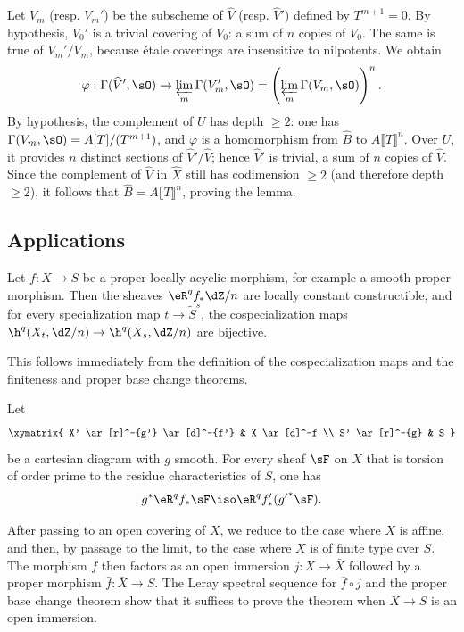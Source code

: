 \documentclass[oneside]{book}
\begin{document}
Let $V_m$ (resp. $V_m'$) be the subscheme of $\widehat V$ (resp.
$\widehat V'$) defined by $T^{m+1}=0$. By hypothesis, $V_0'$ is a
trivial covering of $V_0$: a sum of $n$ copies of $V_0$. The same is true
of $V_m'/V_m$, because étale coverings are insensitive to nilpotents.
We obtain
\[
  \varphi : \Gamma(\widehat V',\sO) \to \varprojlim_m \Gamma(V_m',\sO) = \left(\varprojlim_m \Gamma(V_m,\sO)\right)^n \text{.}
\]
By hypothesis, the complement of $U$ has depth $\geqslant2$: one has
$\Gamma(V_m,\sO)=A[T]/(T^{m+1})$, and $\varphi$ is a homomorphism from
$\widehat B$ to $A\llbracket T\rrbracket^n$. Over $U$, it provides $n$
distinct sections of $\widehat V'/\widehat V$; hence $\widehat V'$ is
trivial, a sum of $n$ copies of $\widehat V$. Since the complement of
$\widehat V$ in $\widehat X$ still has codimension $\geqslant2$ (and
therefore depth $\geqslant2$), it follows that
$\widehat B=A\llbracket T\rrbracket^n$, proving the lemma.

\subsection{Applications}\label{I:5-3}

\begin{theorem}\label{I:5-3-1}
Let $f:X\to S$ be a proper locally acyclic morphism, for example a smooth
proper morphism. Then the sheaves $\eR^qf_*\dZ/n$ are locally constant
constructible, and for every specialization map $t\to\widetilde S^s$,
the cospecialization maps
$\h^q(X_t,\dZ/n)\to\h^q(X_s,\dZ/n)$ are bijective.
\end{theorem}

This follows immediately from the definition of the cospecialization maps
and the finiteness and proper base change theorems.

\begin{theorem}\label{I:5-3-2}
Let
\[\xymatrix{
  X' \ar[r]^-{g'} \ar[d]^-{f'}
    & X \ar[d]^-f \\
  S' \ar[r]^-{g}
    & S
}\]
be a cartesian diagram with $g$ smooth. For every sheaf $\sF$ on $X$
that is torsion of order prime to the residue characteristics of $S$,
one has
\[
  g^* \eR^q f_* \sF \iso \eR^q f'_*({g'}^* \sF) \text{.}
\]
\end{theorem}

After passing to an open covering of $X$, we reduce to the case where
$X$ is affine, and then, by passage to the limit, to the case where $X$
is of finite type over $S$. The morphism $f$ then factors as an open
immersion $j:X\to\bar X$ followed by a proper morphism
$\bar f:\bar X\to S$. The Leray spectral sequence for $\bar f\circ j$
and the proper base change theorem show that it suffices to prove the
theorem when $X\to S$ is an open immersion.
\end{document}
